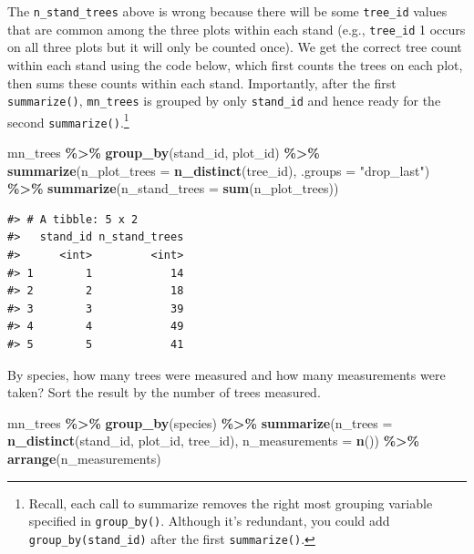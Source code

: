 \documentclass[
  11pt,
]{krantz}
\newenvironment{Shaded}{\begin{snugshade}}{\end{snugshade}}
\newcommand{\DataTypeTok}[1]{\textcolor[rgb]{0.13,0.29,0.53}{#1}}
\newcommand{\KeywordTok}[1]{\textcolor[rgb]{0.13,0.29,0.53}{\textbf{#1}}}
\newcommand{\NormalTok}[1]{#1}
\newcommand{\OperatorTok}[1]{\textcolor[rgb]{0.81,0.36,0.00}{\textbf{#1}}}
\newcommand{\StringTok}[1]{\textcolor[rgb]{0.31,0.60,0.02}{#1}}
\theoremstyle{definition}
\theoremstyle{definition}
\theoremstyle{definition}
\theoremstyle{definition}
\theoremstyle{remark}
\begin{document}
The \texttt{n\_stand\_trees} above is wrong because there will be some \texttt{tree\_id} values that are common among the three plots within each stand (e.g., \texttt{tree\_id} 1 occurs on all three plots but it will only be counted once). We get the correct tree count within each stand using the code below, which first counts the trees on each plot, then sums these counts within each stand. Importantly, after the first \texttt{summarize()}, \texttt{mn\_trees} is grouped by only \texttt{stand\_id} and hence ready for the second \texttt{summarize()}.\footnote{Recall, each call to summarize removes the right most grouping variable specified in \texttt{group\_by()}. Although it's redundant, you could add \texttt{group\_by(stand\_id)} after the first \texttt{summarize()}.}

\begin{Shaded}
\begin{Highlighting}[]
\NormalTok{mn\_trees }\OperatorTok{\%\textgreater{}\%}\StringTok{ }\KeywordTok{group\_by}\NormalTok{(stand\_id, plot\_id) }\OperatorTok{\%\textgreater{}\%}\StringTok{ }
\StringTok{  }\KeywordTok{summarize}\NormalTok{(}\DataTypeTok{n\_plot\_trees =} \KeywordTok{n\_distinct}\NormalTok{(tree\_id), }
            \DataTypeTok{.groups =} \StringTok{"drop\_last"}\NormalTok{) }\OperatorTok{\%\textgreater{}\%}
\StringTok{  }\KeywordTok{summarize}\NormalTok{(}\DataTypeTok{n\_stand\_trees =} \KeywordTok{sum}\NormalTok{(n\_plot\_trees))}
\end{Highlighting}
\end{Shaded}

\begin{verbatim}
#> # A tibble: 5 x 2
#>   stand_id n_stand_trees
#>      <int>         <int>
#> 1        1            14
#> 2        2            18
#> 3        3            39
#> 4        4            49
#> 5        5            41
\end{verbatim}

By species, how many trees were measured and how many measurements were taken? Sort the result by the number of trees measured.

\begin{Shaded}
\begin{Highlighting}[]
\NormalTok{mn\_trees }\OperatorTok{\%\textgreater{}\%}\StringTok{ }\KeywordTok{group\_by}\NormalTok{(species) }\OperatorTok{\%\textgreater{}\%}\StringTok{ }
\StringTok{  }\KeywordTok{summarize}\NormalTok{(}\DataTypeTok{n\_trees =} \KeywordTok{n\_distinct}\NormalTok{(stand\_id, plot\_id, tree\_id), }
            \DataTypeTok{n\_measurements =} \KeywordTok{n}\NormalTok{()) }\OperatorTok{\%\textgreater{}\%}\StringTok{ }
\StringTok{  }\KeywordTok{arrange}\NormalTok{(n\_measurements)}
\end{Highlighting}
\end{Shaded}
\end{document}
